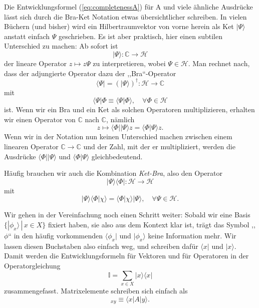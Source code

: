 Die Entwicklungsformel (\ref{eq:completenessA}) für A und viele ähnliche Ausdrücke lässt sich durch die Bra-Ket Notation etwas übersichtlicher schreiben. In vielen Büchern (und bisher) wird ein Hilbertraumvektor von vorne herein als Ket $|\Psi\rangle$ anstatt einfach $\Psi$ geschrieben. Es ist aber praktisch, hier einen subtilen Unterschied zu machen: Ab sofort ist 
\begin{equation}
	|\Psi\rangle: \mathbb{C}\rightarrow \mathcal{H}
\end{equation}
der lineare Operator $z\mapsto z\Psi$ zu interpretieren, wobei $\Psi\in \mathcal{H}$. Man rechnet nach, dass der adjungierte Operator dazu der ,,Bra``-Operator 
\begin{equation}
\langle\Psi| = (|\Psi\rangle)^\dag: \mathcal{H}\rightarrow \mathbb{C}
\end{equation}
mit 
\begin{equation}
\langle \Psi|\Phi \equiv \langle \Psi|\Phi\rangle, \quad \forall \Phi\in \mathcal{H}
\end{equation}
ist. Wenn wir ein Bra und ein Ket als solchen Operatoren multiplizieren, erhalten wir einen Operator von $\mathbb{C}$ nach $\mathbb{C}$, nämlich 
\begin{equation}
	z\mapsto \langle \Phi| |\Psi\rangle z = \langle \Phi|\Psi\rangle z. 
\end{equation}
Wenn wir in der Notation nun keinen Unterschied machen zwischen einem linearen Operator $\mathbb{C}\rightarrow \mathbb{C}$ und der Zahl, mit der er multipliziert, werden die Ausdrücke $\langle \Phi| |\Psi\rangle$ und $\langle \Phi|\Psi\rangle$ gleichbedeutend. 

Häufig brauchen wir auch die Kombination \emph{Ket-Bra}, also
den Operator
\begin{equation}
	|\Psi\rangle\langle \Phi|:\mathcal{H}\rightarrow \mathcal{H}
\end{equation}
mit 
\begin{equation}
	|\Psi\rangle\langle \Phi|\chi\rangle = \langle\Phi|\chi\rangle |\Psi\rangle, \quad \forall \Psi\in \mathcal{H}.
\end{equation}

Wir gehen in der Vereinfachung noch einen Schritt weiter: Sobald wir eine Basis $\{|\phi_x\rangle\,|\, x\in X\}$ fixiert haben, sie also aus dem Kontext klar ist, trägt das Symbol ,,$\phi$`` in den häufig vorkommenden $\langle 
\phi_x|$ und $|\phi_x\rangle$ keine Information mehr. Wir lassen diesen Buchstaben also einfach weg, und schreiben dafür $\langle x|$ und $|x\rangle$. Damit werden die Entwicklungsformeln für Vektoren und für Operatoren in der Operatorgleichung
\begin{equation}
	\mathbb{I} = \sum_{x\in X} |x\rangle\langle x|
\end{equation}
zusammengefasst. Matrixelemente schreiben sich einfach als 
\begin{equation}
	[A]_{xy} \equiv \langle x|A|y\rangle.
\end{equation}

